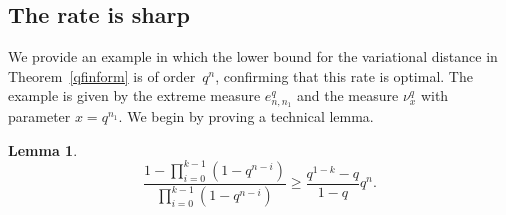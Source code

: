 \documentclass[12pt, a4paper]{amsart}
\numberwithin{equation}{subsection}
\newtheorem{lemma}[equation]{Lemma}
\theoremstyle{definition}
\begin{document}
\subsection{The rate is sharp}\label{sec:sharp}

We provide an example in which the lower bound for the variational distance in Theorem~\eqref{qfinform} is of order~$q^n$, confirming that this rate is optimal. The example is given by the extreme measure \( e^{q}_{n, n_1} \) and the measure \( \nu^{q}_{x} \) with parameter \( x = q^{n_1} \).
We begin by proving a technical lemma.

\begin{lemma}\label{example_lemma}
\begin{equation}
\dfrac{1 - \prod_{i=0}^{k-1}(1 - q^{n - i})}{\prod_{i=0}^{k-1}(1 - q^{n - i})} \geqslant \dfrac{q^{1-k}-q}{1-q} q^{n}.
\end{equation}
\end{lemma}
\end{document}

